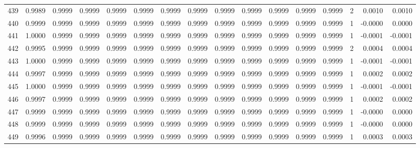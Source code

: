 \begin{tabular}{lrrrrrrrrrrrrrrr}
439 &      0.9989 &  0.9999 &  0.9999 &  0.9999 &  0.9999 &  0.9999 &  0.9999 &  0.9999 &  0.9999 &  0.9999 &   0.9999 &     0.9999 &      2 &                    0.0010 &                     0.0010 \\
440 &      0.9999 &  0.9999 &  0.9999 &  0.9999 &  0.9999 &  0.9999 &  0.9999 &  0.9999 &  0.9999 &  0.9999 &   0.9999 &     0.9999 &      1 &                   -0.0000 &                     0.0000 \\
441 &      1.0000 &  0.9999 &  0.9999 &  0.9999 &  0.9999 &  0.9999 &  0.9999 &  0.9999 &  0.9999 &  0.9999 &   0.9999 &     0.9999 &      1 &                   -0.0001 &                    -0.0001 \\
442 &      0.9995 &  0.9999 &  0.9999 &  0.9999 &  0.9999 &  0.9999 &  0.9999 &  0.9999 &  0.9999 &  0.9999 &   0.9999 &     0.9999 &      2 &                    0.0004 &                     0.0004 \\
443 &      1.0000 &  0.9999 &  0.9999 &  0.9999 &  0.9999 &  0.9999 &  0.9999 &  0.9999 &  0.9999 &  0.9999 &   0.9999 &     0.9999 &      1 &                   -0.0001 &                    -0.0001 \\
444 &      0.9997 &  0.9999 &  0.9999 &  0.9999 &  0.9999 &  0.9999 &  0.9999 &  0.9999 &  0.9999 &  0.9999 &   0.9999 &     0.9999 &      1 &                    0.0002 &                     0.0002 \\
445 &      1.0000 &  0.9999 &  0.9999 &  0.9999 &  0.9999 &  0.9999 &  0.9999 &  0.9999 &  0.9999 &  0.9999 &   0.9999 &     0.9999 &      1 &                   -0.0001 &                    -0.0001 \\
446 &      0.9997 &  0.9999 &  0.9999 &  0.9999 &  0.9999 &  0.9999 &  0.9999 &  0.9999 &  0.9999 &  0.9999 &   0.9999 &     0.9999 &      1 &                    0.0002 &                     0.0002 \\
447 &      0.9999 &  0.9999 &  0.9999 &  0.9999 &  0.9999 &  0.9999 &  0.9999 &  0.9999 &  0.9999 &  0.9999 &   0.9999 &     0.9999 &      1 &                   -0.0000 &                     0.0000 \\
448 &      0.9999 &  0.9999 &  0.9999 &  0.9999 &  0.9999 &  0.9999 &  0.9999 &  0.9999 &  0.9999 &  0.9999 &   0.9999 &     0.9999 &      1 &                   -0.0000 &                     0.0000 \\
449 &      0.9996 &  0.9999 &  0.9999 &  0.9999 &  0.9999 &  0.9999 &  0.9999 &  0.9999 &  0.9999 &  0.9999 &   0.9999 &     0.9999 &      1 &                    0.0003 &                     0.0003 \\

\end{tabular}
